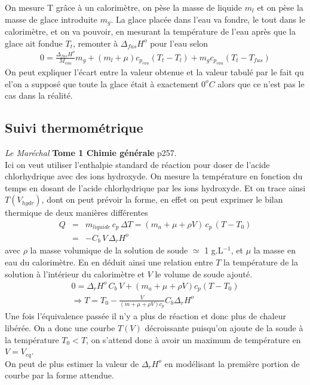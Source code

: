 \documentclass[12pt,prb,aps,epsf]{article}
\begin{document}
On mesure T grâce à un calorimètre, on pèse la masse de liquide $m_l$ et on pèse la masse de glace introduite $m_g$. La glace placée dans l'eau va fondre, le tout dans le calorimètre, et on va pouvoir, en mesurant la température de l'eau après que la glace ait fondue $T_t$, remonter à $\Delta _{fus}H^o$ pour l'eau selon 
\begin{eqnarray}
0 = \frac{\Delta_{fus} H^o }{M_{eau}}m_g + (m_l+\mu)c_{p_{eau}}(T_t-T_l) + m_g c_{p_{eau}}(T_t-T_{fus})
\end{eqnarray} 
On peut expliquer l'écart entre la valeur obtenue et la valeur tabulé par le fait qu el'on a supposé que toute la glace était à exactement $0^oC$ alors que ce n'est pas le cas dans la réalité.

\subsection{Suivi thermométrique}
\textit{Le Maréchal} \textbf{Tome 1 Chimie générale} p257.\\

Ici on veut utiliser l'enthalpie standard de réaction pour doser de l'acide chlorhydrique avec des ions hydroxyde. On mesure la température en fonction du temps en dosant de l'acide chlorhydrique par les ions hydroxyde. Et on trace ainsi $T(V_{hydr})$, dont on peut prévoir la forme, en effet on peut exprimer le bilan thermique de deux manières différentes 
\begin{eqnarray}
Q &=& m_{liquide}\, c_p\, \Delta T = (m_a+\mu + \rho V)\,c_p \,(T-T_0)\\
&=& -C_b\, V\, \Delta_rH^o
\end{eqnarray}
avec $\rho$ la masse volumique de la solution de soude $\simeq $ 1 g.L$^{-1}$, et $\mu$ la masse en eau du calorimètre. En en déduit ainsi une relation entre $T$ la température de la solution à l'intérieur du calorimètre et $V$ le volume de soude ajouté.
\begin{eqnarray}
0 = \Delta _r H^o \,C_b\,V + (m_a+\mu + \rho V)c_p (T-T_0)\\
\Rightarrow T = T_0 - \frac{V}{(m+\mu + \rho V)c_p}C_b\Delta_rH^o 
\end{eqnarray}
Une fois l'équivalence passée il n'y a plus de réaction et donc plus de chaleur libérée. On a donc une courbe $T(V)$ décroissante puisqu'on ajoute de la soude à la température $T_0<T$, on s'attend donc à avoir un maximum de température en $V=V_{eq}$.\\
On peut de plus estimer la valeur de $\Delta_rH^o$ en modélisant la première portion de courbe par la forme attendue.
\end{document}
